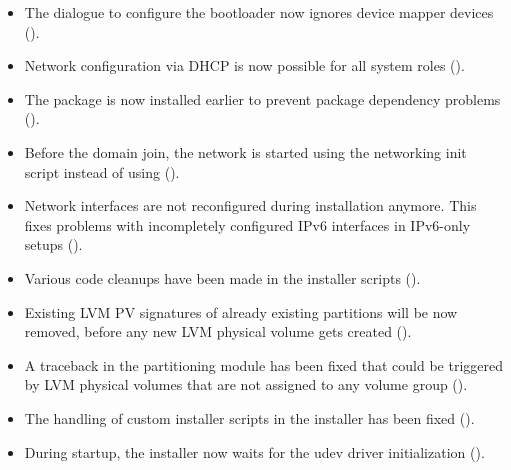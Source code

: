 \begin{itemize}
\item The dialogue to configure the bootloader now ignores device
  mapper devices ().

\item Network configuration via DHCP is now possible for all system
roles ().

\item The package  is now installed
  earlier to prevent package dependency problems ().

\item Before the domain join, the network is started using the
  networking init script instead of using 
  ().

\item Network interfaces are not  reconfigured during installation
  anymore. This fixes problems with incompletely configured IPv6
  interfaces in IPv6-only setups ().

\item Various code cleanups have been made in the installer scripts
().

\item Existing LVM PV signatures of already existing partitions will
  be now removed, before any new LVM physical volume gets created
  ().

\item A traceback in the partitioning module has been fixed that could
  be triggered by LVM physical volumes that are not assigned to any
  volume group ().

\item The handling of custom installer scripts in the installer has been
fixed ().

\item During startup, the installer now waits for the udev driver
  initialization ().

\end{itemize}

